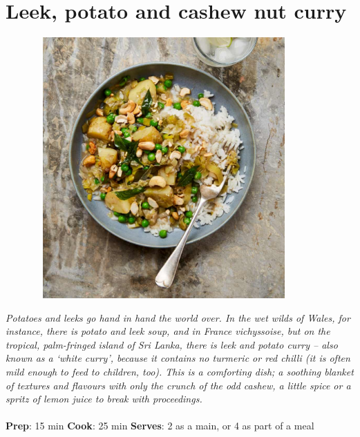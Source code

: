 \documentclass{book}
\begin{document}
\section{Leek, potato and cashew nut curry}
\begin{figure}
\centering\includegraphics[width=10cm,height=10cm,keepaspectratio]{Recipe_Pictures/Leek,_potato_and_cashew_nut_curry.png}
\end{figure}
\emph{Potatoes and leeks go hand in hand the world over. In the wet wilds of Wales, for instance, there is potato and leek soup, and in France vichyssoise, but on the tropical, palm-fringed island of Sri Lanka, there is leek and potato curry – also known as a ‘white curry’, because it contains no turmeric or red chilli (it is often mild enough to feed to children, too). This is a comforting dish; a soothing blanket of textures and flavours with only the crunch of the odd cashew, a little spice or a spritz of lemon juice to break with proceedings.}\\\\ 
\textbf{Prep}: 15 min
\textbf{Cook}: 25 min
\textbf{Serves}: 2 as a main, or 4 as part of a meal
\end{document}
